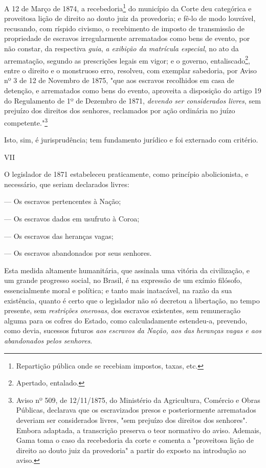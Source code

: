 A 12 de Março de 1874, a recebedoria\footnote{Repartição pública onde
  se recebiam impostos, taxas, etc.} do município da Corte deu
categórica e proveitosa lição de direito ao douto juiz da provedoria; e
fê-lo de modo louvável, recusando, com ríspido civismo, o recebimento de
imposto de transmissão de propriedade de escravos irregularmente
arrematados como bens de evento, por não constar, da respectiva
\emph{guia}, \emph{a exibição da matrícula especial}, no ato da
arrematação, segundo as prescrições legais em vigor; e o governo,
entaliscado\footnote{Apertado, entalado.}, entre o direito e o
monstruoso erro, resolveu, com exemplar sabedoria, por Aviso nº 3 de 12
de Novembro de 1875, "que aos escravos recolhidos em casa de detenção, e
arrematados como bens do evento, aproveita a disposição do artigo 19 do
Regulamento de 1º de Dezembro de 1871, \emph{devendo ser considerados
livres}, sem prejuízo dos direitos dos senhores, reclamados por ação
ordinária no juízo competente."\footnote{Aviso nº 509, de 12/11/1875,
  do Ministério da Agricultura, Comércio e Obras Públicas, declarava que
  os escravizados presos e posteriormente arrematados deveriam ser
  considerados livres, "sem prejuízo dos direitos dos senhores". Embora
  adaptada, a transcrição preserva o teor normativo do aviso. Ademais,
  Gama toma o caso da recebedoria da corte e comenta a "proveitosa lição
  de direito ao douto juiz da provedoria" a partir do exposto na
  introdução ao aviso.}

Isto, sim, é jurisprudência; tem fundamento jurídico e foi externado com
critério.

VII

O legislador de 1871 estabeleceu praticamente, como princípio
abolicionista, e necessário, que seriam declarados livres:

--- Os escravos pertencentes à Nação;

--- Os escravos dados em usufruto à Coroa;

--- Os escravos das heranças vagas;

--- Os escravos abandonados por seus senhores.

Esta medida altamente humanitária, que assinala uma vitória da
civilização, e um grande progresso social, no Brasil, é na expressão de
um exímio filósofo, essencialmente moral e política; e tanto mais
inatacável, na razão da sua existência, quanto é certo que o legislador
não só decretou a libertação, no tempo presente, sem \emph{restrições
onerosas}, dos escravos existentes, sem remuneração alguma para os
cofres do Estado, como calculadamente estendeu-a, prevendo, como devia,
sucessos futuros \emph{aos escravos da Nação, aos das heranças vagas e
aos abandonados pelos senhores}.

